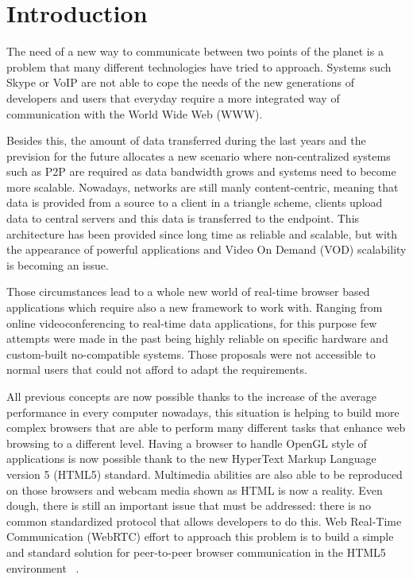 \section{Introduction}

\thispagestyle{empty}

The need of a new way to communicate between two points of the planet is a problem that many different technologies have tried to approach. Systems such Skype or VoIP are not able to cope the needs of the new generations of developers and users that everyday require a more integrated way of communication with the World Wide Web (WWW). 

Besides this, the amount of data transferred during the last years and the prevision for the future allocates a new scenario where non-centralized systems such as P2P are required as data bandwidth grows and systems need to become more scalable. Nowadays, networks are still manly content-centric, meaning that data is provided from a source to a client in a triangle scheme, clients upload data to central servers and this data is transferred to the endpoint. This architecture has been provided since long time as reliable and scalable, but with the appearance of powerful applications and Video On Demand (VOD) scalability is becoming an issue.

Those circumstances lead to a whole new world of real-time browser based applications which require also a new framework to work with. Ranging from online videoconferencing to real-time data applications, for this purpose few attempts were made in the past being highly reliable on specific hardware and custom-built no-compatible systems. Those proposals were not accessible to normal users that could not afford to adapt the requirements. 

All previous concepts are now possible thanks to the increase of the average performance in every computer nowadays, this situation is helping to build more complex browsers that are able to perform many different tasks that enhance web browsing to a different level. Having a browser to handle OpenGL style of applications is now possible thank to the new  HyperText Markup Language version 5 (HTML5) standard. Multimedia abilities are also able to be reproduced on those browsers and webcam media shown as HTML is now a reality. Even dough, there is still an important issue that must be addressed: there is no common standardized protocol that allows developers to do this. Web Real-Time Communication (WebRTC) effort to approach this problem is to build a simple and standard solution for peer-to-peer browser communication in the HTML5 environment~\cite{alvestrandOverview2012} .

